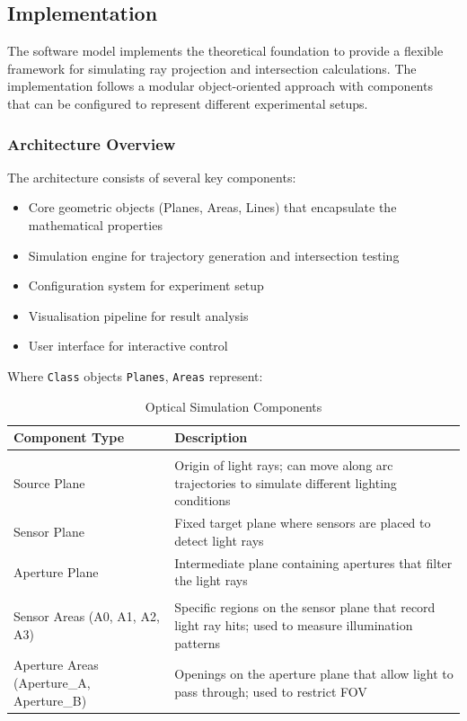 \subsection{Implementation}

The software model implements the theoretical foundation to provide a flexible framework for simulating ray projection and intersection calculations. The implementation follows a modular object-oriented approach with  components that can be configured to represent different experimental setups.

\subsubsection{Architecture Overview}

The architecture consists of several key components:
\begin{itemize}
\item Core geometric objects (Planes, Areas, Lines) that encapsulate the mathematical properties
\item Simulation engine for trajectory generation and intersection testing
\item Configuration system for experiment setup
\item Visualisation  pipeline for result analysis
\item User interface for interactive control
\end{itemize}

Where \texttt{Class} objects \texttt{Planes}, \texttt{Areas} represent:
\begin{table}[h]
    \centering
    \caption{Optical Simulation Components}
    \label{tab:optical_components}
    \begin{tabular}{>{\raggedright\arraybackslash}p{3cm}>{\raggedright\arraybackslash}p{8cm}}
    \toprule
    \textbf{Component Type} & \textbf{Description} \\
    \midrule
    \multicolumn{2}{l}{\textbf{Planes}} \\
    \midrule
    Source Plane & Origin of light rays; can move along arc trajectories to simulate different lighting conditions \\
    Sensor Plane & Fixed target plane where sensors are placed to detect light rays \\
    Aperture Plane & Intermediate plane containing apertures that filter the light rays \\
    \midrule
    \multicolumn{2}{l}{\textbf{Areas}} \\
    \midrule
    Sensor Areas (A0, A1, A2, A3) & Specific regions on the sensor plane that record light ray hits; used to measure illumination patterns \\
    Aperture Areas (Aperture\_A, Aperture\_B) & Openings on the aperture plane that allow light to pass through; used to restrict FOV \\
    \bottomrule
    \end{tabular}
    \end{table}

